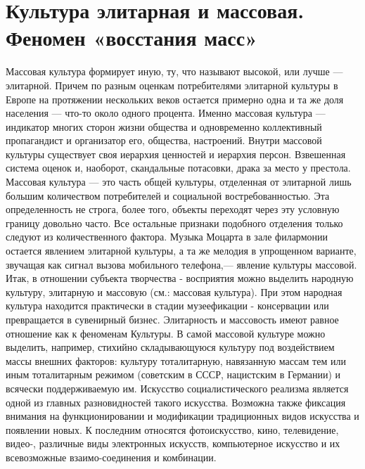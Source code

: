 \documentclass[12pt]{article}
\begin{document}
\newpage
\section{Культура элитарная и массовая. Феномен «восстания масс»}
Массовая культура формирует иную, ту, что называют высокой, или лучше — элитарной. Причем по разным
оценкам потребителями элитарной культуры в Европе на протяжении нескольких веков остается примерно одна
и та же доля населения — что-то около одного процента. Именно массовая культура — индикатор многих
сторон жизни общества и одновременно коллективный пропагандист и организатор его, общества, настроений.
Внутри массовой культуры существует своя иерархия ценностей и иерархия персон. Взвешенная система
оценок и, наоборот, скандальные потасовки, драка за место у престола.
Массовая культура — это часть общей культуры, отделенная от элитарной лишь большим количеством
потребителей и социальной востребованностью. Эта определенность не строга, более того, объекты переходят
через эту условную границу довольно часто. Все остальные признаки подобного отделения только следуют из
количественного фактора.
Музыка Моцарта в зале филармонии остается явлением элитарной культуры, а та же мелодия в упрощенном
варианте, звучащая как сигнал вызова мобильного телефона,— явление культуры массовой.
Итак, в отношении субъекта творчества - восприятия можно выделить народную культуру, элитарную и
массовую (см.: массовая культура). При этом народная культура находится практически в стадии музеефикации
- консервации или превращается в сувенирный бизнес.
Элитарность и массовость имеют равное отношение как к феноменам Культуры. В самой массовой культуре
можно выделить, например, стихийно складывающуюся культуру под воздействием массы внешних факторов:
культуру тоталитарную, навязанную массам тем или иным тоталитарным режимом (советским в СССР,
нацистским в Германии) и всячески поддерживаемую им. Искусство социалистического реализма является
одной из главных разновидностей такого искусства.
Возможна также фиксация внимания на функционировании и модификации традиционных видов искусства и
появлении новых. К последним относятся фотоискусство, кино, телевидение, видео-, различные виды
электронных искусств, компьютерное искусство и их всевозможные взаимо-соединения и комбинации. 
\end{document}
